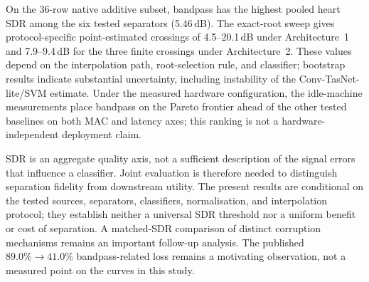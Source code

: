 \documentclass[journal]{IEEEtran}
\begin{document}
On the 36-row native additive subset, bandpass has the highest pooled heart SDR among the six tested separators (5.46\,dB). The exact-root sweep gives protocol-specific point-estimated crossings of 4.5--20.1\,dB under Architecture~1 and 7.9--9.4\,dB for the three finite crossings under Architecture~2. These values depend on the interpolation path, root-selection rule, and classifier; bootstrap results indicate substantial uncertainty, including instability of the Conv-TasNet-lite/SVM estimate. Under the measured hardware configuration, the idle-machine measurements place bandpass on the Pareto frontier ahead of the other tested baselines on both MAC and latency axes; this ranking is not a hardware-independent deployment claim.

SDR is an aggregate quality axis, not a sufficient description of the signal errors that influence a classifier. Joint evaluation is therefore needed to distinguish separation fidelity from downstream utility. The present results are conditional on the tested sources, separators, classifiers, normalisation, and interpolation protocol; they establish neither a universal SDR threshold nor a uniform benefit or cost of separation. A matched-SDR comparison of distinct corruption mechanisms remains an important follow-up analysis. The published $89.0\%\to41.0\%$ bandpass-related loss remains a motivating observation, not a measured point on the curves in this study.
\end{document}
